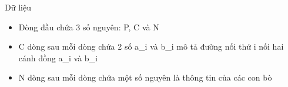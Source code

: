 Dữ liệu  
\begin{itemize}
	\item     Dòng đầu chứa 3 số nguyên: P, C và N   
	\item     C dòng sau mỗi dòng chứa 2 số a\_i và b\_i mô tả đường nối thứ i nối hai cánh đồng a\_i và b\_i   
	\item     N dòng sau mỗi dòng chứa một số nguyên là thông tin của các con bò   
\end{itemize}